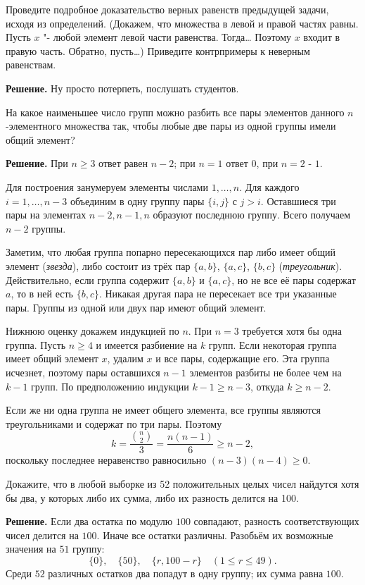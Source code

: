 \begin{problems}
\item Проведите подробное доказательство верных равенств предыдущей задачи, исходя из определений. (Докажем, что множества в левой и правой частях равны. Пусть $x$ "- любой элемент левой части равенства. Тогда\ldots{} Поэтому $x$ входит в правую часть. Обратно, пусть\ldots) Приведите контрпримеры к неверным равенствам.
\par\smallskip\noindent\textbf{Решение.} Ну просто потерпеть, послушать студентов. \par

\item На какое наименьшее число групп можно разбить все пары элементов данного $n$-элементного множества так, чтобы любые две пары из одной группы имели общий элемент?
\par\smallskip\noindent\textbf{Решение.} При $n\ge3$ ответ равен $n-2$; при $n=1$ ответ $0$, при $n=2$ - $1$.
\par Для построения занумеруем элементы числами $1,\ldots,n$. Для каждого $i=1,\ldots,n-3$ объединим в одну группу пары $\{i,j\}$ с $j>i$. Оставшиеся три пары на элементах $n-2,n-1,n$ образуют последнюю группу. Всего получаем $n-2$ группы.
\par Заметим, что любая группа попарно пересекающихся пар либо имеет общий элемент (\textit{звезда}), либо состоит из трёх пар $\{a,b\}$, $\{a,c\}$, $\{b,c\}$ (\textit{треугольник}). Действительно, если группа содержит $\{a,b\}$ и $\{a,c\}$, но не все её пары содержат $a$, то в ней есть $\{b,c\}$. Никакая другая пара не пересекает все три указанные пары. Группы из одной или двух пар имеют общий элемент.
\par Нижнюю оценку докажем индукцией по $n$. При $n=3$ требуется хотя бы одна группа. Пусть $n\ge4$ и имеется разбиение на $k$ групп. Если некоторая группа имеет общий элемент $x$, удалим $x$ и все пары, содержащие его. Эта группа исчезнет, поэтому пары оставшихся $n-1$ элементов разбиты не более чем на $k-1$ групп. По предположению индукции $k-1\ge n-3$, откуда $k\ge n-2$.
\par Если же ни одна группа не имеет общего элемента, все группы являются треугольниками и содержат по три пары. Поэтому
\[
k=\frac{\binom n2}{3}=\frac{n(n-1)}6\ge n-2,
\]
поскольку последнее неравенство равносильно $(n-3)(n-4)\ge0$.\par

\item Докажите, что в любой выборке из 52 положительных целых чисел найдутся хотя бы два, у которых либо их сумма, либо их разность делится на 100.
\par\smallskip\noindent\textbf{Решение.} Если два остатка по модулю $100$ совпадают, разность соответствующих чисел делится на $100$. Иначе все остатки различны. Разобьём их возможные значения на $51$ группу:
\[
\{0\},\quad\{50\},\quad\{r,100-r\}\quad(1\le r\le49).
\]
Среди $52$ различных остатков два попадут в одну группу; их сумма равна $100$.\par


\end{problems}
